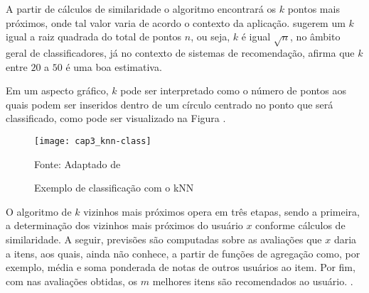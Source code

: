             A partir de cálculos de similaridade o algoritmo encontrará os $k$ pontos mais próximos, onde tal valor varia de acordo o contexto da aplicação.  sugerem um $k$  igual a raiz quadrada do total de pontos $n$, ou seja, $k$ é igual $\sqrt{n}$, no âmbito geral de classificadores, já no contexto de sistemas de recomendação,  afirma que $k$  entre $20$ a $50$ é uma boa estimativa. 
            
            Em um aspecto gráfico, $k$ pode ser interpretado como o número de pontos aos quais podem ser inseridos dentro de um círculo centrado no ponto que será classificado, como pode ser visualizado na Figura . 
            
            \begin{figure}[htb]
                \caption{Exemplo de classificação com o kNN}
                \texttt{[image: cap3\_knn-class]}
                \label{fig:cap3_knn-class}
                
                {\footnotesize Fonte: Adaptado de }
            \end{figure}            
            
                 
            O algoritmo de $k$ vizinhos mais próximos opera em três etapas, sendo a primeira, a determinação dos vizinhos mais próximos do usuário $x$ conforme cálculos de similaridade. A seguir, previsões são computadas sobre as avaliações que $x$ daria a itens, aos quais, ainda não conhece, a partir de funções de agregação como, por exemplo, média e soma ponderada de notas de outros usuários ao item. Por fim, com nas avaliações obtidas, os $m$ melhores itens são recomendados ao usuário. \cite{Bobadilla_2013}.
            
                
                            
    
